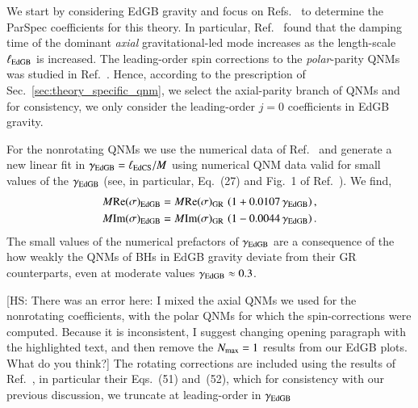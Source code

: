 \documentclass[twocolumn,
               prd,
               aps,
               superscriptaddress,
               tightenlines,
               nofootinbib,
               eqsecnum,
               amsfonts,
               amsmath,
               longbibliography]{revtex4-1}
\newcommand{\hs}[1]{{\textcolor{TealBlue}{{#1}}}}
\newcommand{\hscomm}[1]{{\textcolor{TealBlue}{{[HS: #1]}}}}
\newcommand{\abcomm}[1]{{\textcolor{red}{{[AB: #1]}}}}
\begin{document}
We start by considering EdGB gravity and focus on
Refs.~\cite{Blazquez-Salcedo:2016enn,Pierini:2021jxd} to determine the ParSpec coefficients for this theory.
%
In particular, Ref.~\cite{Blazquez-Salcedo:2016enn} found that the damping time
of the \hs{dominant \emph{axial} gravitational-led} mode increases as the length-scale
$\ell_{\rm EdGB}$ is increased. The leading-order spin corrections to the
\emph{polar}-parity QNMs was studied in Ref.~\cite{Pierini:2021jxd}.
%
Hence, according to the prescription of Sec.~\ref{sec:theory_specific_qnm},
\hs{we select the axial-parity branch of QNMs and
%
for consistency, we only consider the leading-order $j=0$ coefficients in EdGB gravity.}

For the nonrotating QNMs we use
the numerical data of Ref.~\cite{Blazquez-Salcedo:2016enn} and
generate a new \hs{linear} fit in $\gamma_{\rm EdGB} = \ell_{\rm EdCS} / M$ using numerical QNM data valid for small
values of the $\gamma_{\rm EdGB}$ (see, in particular, Eq.~(27) and Fig.~1 of
Ref.~\cite{Blazquez-Salcedo:2016enn}).
%
We find,
%
\begin{subequations}
\begin{align}
    M {\rm Re}(\sigma)_{\rm EdGB} &= M {\rm Re}(\sigma)_{\rm GR} \, \left( 1 + 0.0107 \, \gamma_{\rm EdGB} \right),
    \\
    M {\rm Im}(\sigma)_{\rm EdGB} &= M {\rm Im}(\sigma)_{\rm GR} \, \left( 1 - 0.0044 \, \gamma_{\rm EdGB} \right).
\end{align}
\end{subequations}
%
The small values of the numerical prefactors of $\gamma_{\rm EdGB}$ are a consequence of the how weakly the QNMs
of BHs in EdGB gravity deviate from their GR counterparts, even at moderate values $\gamma_{\rm EdGB} \approx 0.3$.

\hscomm{There was an error here: I mixed the axial QNMs we used for the nonrotating coefficients, with the polar QNMs
for which the spin-corrections were computed. Because it is inconsistent, I suggest changing opening paragraph with the highlighted text,
and then remove the $N_{\rm max} = 1$ results from our EdGB plots. What do you think?}
%
The rotating corrections are included using the results of Ref.~\cite{Pierini:2021jxd}, in particular their Eqs.~(51) and~(52),
which for consistency with our previous discussion, we truncate at \hs{leading-order in} $\gamma_{\rm EdGB}$
\end{document}
